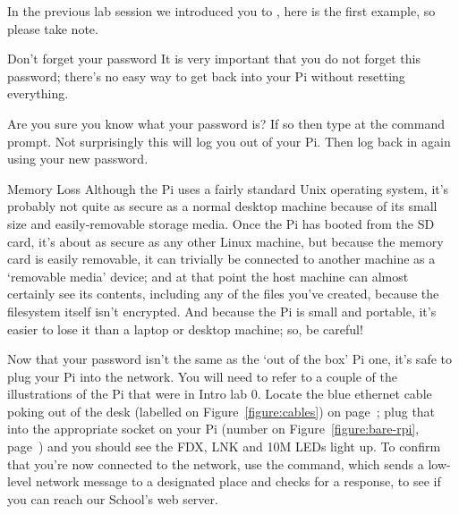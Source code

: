 In the previous lab session we introduced you to , here is the first example, so please take note.

\begin{danger}{Don't forget your password}
It is very important that you do not forget this password; there's no easy way to get back into your Pi without resetting everything.
\end{danger}

Are you sure you know what your password is? If so then type  at the command prompt. Not surprisingly this will log you out of your Pi. Then log back in again using your new password.

\begin{danger}{Memory Loss}
Although the Pi uses a fairly standard Unix operating system, it's probably not quite as secure as a normal desktop machine because of its small size and easily-removable storage media. Once the Pi has booted from the SD card, it's about as secure as any other Linux machine, but because the memory card is easily removable, it can trivially be connected to another machine as a `removable media' device; and at that point the host machine can almost certainly see its contents, including any of the files you've created, because the filesystem itself isn't encrypted. And because the Pi is small and portable, it's easier to lose it than a laptop or desktop machine; so, be careful!
\end{danger}

Now that your password isn't the same as the `out of the box' Pi one, it's safe to plug your Pi into the network. You will need to refer to a couple of the illustrations of the Pi that were in Intro lab 0. Locate the blue ethernet cable poking out of the desk (labelled \protect{} on Figure~\ref{figure:cables}) on page~\pageref{figure:cables}; plug that into the appropriate socket on your Pi (number  on Figure~\ref{figure:bare-rpi}, page~\pageref{figure:bare-rpi}) and you should see the FDX, LNK and 10M LEDs light up. To confirm that you're now connected to the network, use the  command, which sends a low-level network message to a designated place and checks for a response, to see if you can reach our School's web server.


